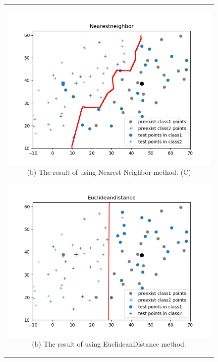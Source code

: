 \documentclass[10.5pt]{jsarticle}
\begin{document}
 \begin{figure}[htbp]
   \centering
   \begin{tabular}{c}
   	\begin{minipage}{0.56\hsize}
   	\centering
   		\includegraphics[width=15.0cm, bb=9 9 700 270]{results/NearestneighborResultFigureC.png}
   		\hspace{0cm} (b) The result of using Nearest Neighbor method. (C)
   	\end{minipage}

   	\begin{minipage}{0.5\hsize}
   	\centering
   		\includegraphics[width=15.0cm, bb=9 9 700 270]{results/EuclideandistanceResultFigureC.png}
   		\hspace{0cm} (b) The result of using EuclideanDistance method.
   	\end{minipage}
   \end{tabular}
 \end{figure}
\end{document}
